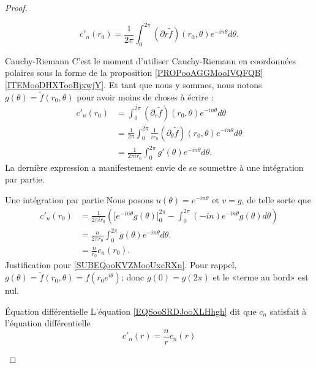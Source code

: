 \begin{proof}
\begin{subproof}
			\begin{equation}
				c'_n(r_0)=\frac{1}{ 2\pi }\int_0^{2\pi}(\partial r\tilde f)(r_0,\theta) e^{-in\theta}d\theta.
			\end{equation}
			\item[Cauchy-Riemann]
			C'est le moment d'utiliser Cauchy-Riemann en coordonnées polaires sous la forme de la proposition \ref{PROPooAGGMooIVQFQB}\ref{ITEMooDHXTooBjxwjY}. Et tant que nous y sommes, nous notons \( g(\theta)=\tilde f(r_0,\theta)\) pour avoir moins de choses à écrire :
			\begin{subequations}
				\begin{align}
					c'_n(r_0) & =\int_0^{2\pi}(\partial_r\tilde f)(r_0,\theta) e^{-in\theta}d\theta                                        \\
					          & =\frac{1}{ 2\pi }\int_0^{2\pi}\frac{1}{ ir_0 }(\partial_{\theta}\tilde f)(r_0,\theta) e^{-in\theta}d\theta \\
					          & =\frac{1}{ 2\pi ir_0 }\int_{0}^{2\pi}g'(\theta) e^{-in\theta}d\theta.
				\end{align}
			\end{subequations}
			La dernière expression a manifestement envie de se soumettre à une intégration par partie.
			\item[Une intégration par partie]
			Nous posons \( u(\theta)= e^{-in\theta}\) et \( v=g\), de telle sorte que
			\begin{subequations}        \label{EQSooSRDJooXLHhgh}
				\begin{align}
					c'_n(r_0) & =\frac{1}{ 2\pi i r_0 }\left( \big[ e^{-in\theta}g(\theta)\big]_0^{2\pi}-\int_0^{2\pi}(-in) e^{-in\theta}g(\theta)d\theta \right) \\
					          & =\frac{n}{ 2\pi r_0 }\int_0^{2\pi}g(\theta) e^{-in\theta}d\theta.           \label{SUBEQooKVZMooUxcRXn}                           \\
					          & =\frac{n}{ r_0 }c_n(r_0).
				\end{align}
			\end{subequations}
			Justification pour \eqref{SUBEQooKVZMooUxcRXn}. Pour rappel, \( g(\theta)=\tilde f(r_0,\theta)=f(r_0 e^{i\theta})\); donc \( g(0)=g(2\pi)\) et le «terme au bord» est nul.
			\item[Équation différentielle]
			L'équation \eqref{EQSooSRDJooXLHhgh} dit que \( c_n\) satisfait à l'équation différentielle
			\begin{equation}
				c'_n(r)=\frac{ n }{ r }c_n(r)
			\end{equation}

\end{subproof}
\end{proof}
